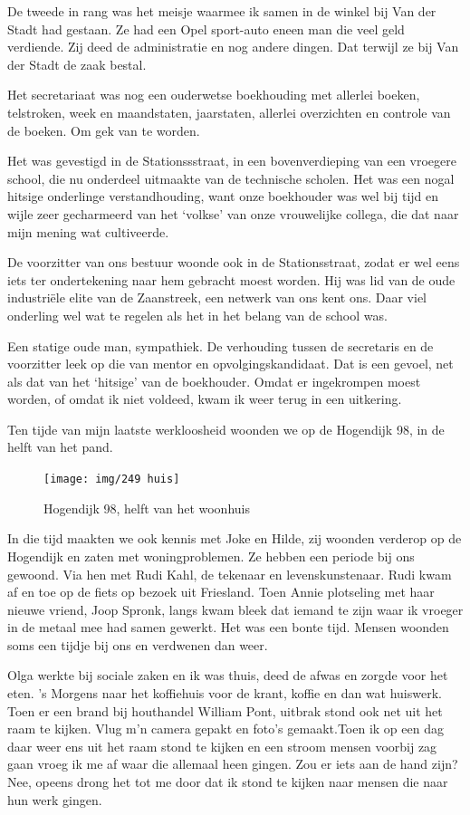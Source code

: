 \documentclass[10pt,twoside, openright]{memoir}
\begin{document}
De tweede in rang was het meisje waarmee ik samen in de winkel bij Van der Stadt had gestaan. Ze had een Opel sport-auto eneen man die veel geld verdiende. Zij deed de administratie en nog andere dingen. Dat terwijl ze bij Van der Stadt de zaak bestal.

Het secretariaat was nog een ouderwetse boekhouding met allerlei boeken, telstroken, week en maandstaten, jaarstaten, allerlei overzichten en controle van de boeken. Om gek van te worden. 

Het was gevestigd in de Stationssstraat, in een bovenverdieping van een vroegere school, die nu onderdeel uitmaakte van de technische scholen. Het was een nogal hitsige onderlinge verstandhouding, want onze boekhouder was wel bij tijd en wijle zeer gecharmeerd van het `volkse' van onze vrouwelijke collega, die dat naar mijn mening wat cultiveerde. 

De voorzitter van ons bestuur woonde ook in de Stationsstraat, zodat er wel eens iets ter ondertekening naar hem gebracht moest worden. Hij was lid van de oude industriële elite van de Zaanstreek, een netwerk van ons kent ons. Daar viel onderling wel wat te regelen als het in het belang van de school was. 

Een statige oude man, sympathiek. De verhouding tussen de secretaris en de voorzitter leek op die van mentor en opvolgingskandidaat. Dat is een gevoel, net als dat van het `hitsige' van de boekhouder. Omdat er ingekrompen moest worden, of omdat ik niet voldeed, kwam ik weer terug in een uitkering.

Ten tijde van mijn laatste werkloosheid woonden we op de Hogendijk 98, in de helft van het pand.

\begin{figure}
\texttt{[image: img/249 huis]}
\caption*{\footnotesize Hogendijk 98, helft van het woonhuis}
\end{figure}

In die tijd maakten we ook kennis met Joke en Hilde, zij woonden verderop op de Hogendijk en zaten met woningproblemen. Ze hebben een periode bij ons gewoond. Via hen met Rudi Kahl, de tekenaar en levenskunstenaar. Rudi kwam af en toe op de fiets op bezoek uit Friesland. Toen Annie plotseling met haar nieuwe vriend, Joop Spronk, langs kwam bleek dat iemand te zijn waar ik vroeger in de metaal mee had samen gewerkt. Het was een bonte tijd. Mensen woonden soms een tijdje bij ons en verdwenen dan weer. 

Olga werkte bij sociale zaken en ik was thuis, deed de afwas en zorgde voor het eten. 's Morgens naar het koffiehuis voor de krant, koffie en dan wat huiswerk. Toen er een brand bij houthandel William Pont, uitbrak stond ook net uit het raam te kijken. Vlug m'n camera gepakt en foto's gemaakt.Toen ik op een dag daar weer ens uit het raam stond te kijken en een stroom mensen voorbij zag gaan vroeg ik  me af waar die allemaal heen gingen. Zou er iets aan de hand zijn? Nee, opeens drong het tot me door dat ik stond te kijken naar mensen die naar hun werk gingen. 
\end{document}
